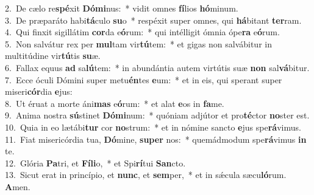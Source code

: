 {2.~}De cælo re\textbf{spé}xit \textbf{Dó}\textbf{mi}nus:~* vidit omnes \textbf{fí}lios \textbf{hó}minum.\\
{3.~}De præparáto habi\textbf{tá}culo \textbf{su}o~* respéxit super omnes, qui \textbf{há}bitant \textbf{ter}ram.\\
{4.~}Qui finxit sigillátim \textbf{cor}da e\textbf{ó}rum:~* qui intélligit ómnia ópe\textbf{ra} e\textbf{ó}rum.\\
{5.~}Non salvátur rex per \textbf{mul}tam vir\textbf{tú}tem:~* et gigas non salvábitur in multitúdine vir\textbf{tú}tis \textbf{su}æ.\\
{6.~}Fallax equus \textbf{ad} sa\textbf{lú}tem:~* in abundántia autem virtútis suæ \textbf{non} sal\textbf{vá}bitur.\\
{7.~}Ecce óculi Dómini super metu\textbf{én}tes \textbf{e}um:~* et in eis, qui sperant super miseri\textbf{cór}dia \textbf{e}jus:\\
{8.~}Ut éruat a morte áni\textbf{mas} e\textbf{ó}rum:~* et alat \textbf{e}os in \textbf{fa}me.\\
{9.~}Anima nostra \textbf{sú}stinet \textbf{Dó}\textbf{mi}num:~* quóniam adjútor et pro\textbf{té}ctor \textbf{no}ster est.\\
{10.~}Quia in eo lætábi\textbf{tur} cor \textbf{no}strum:~* et in nómine sancto \textbf{e}jus spe\textbf{rá}vimus.\\
{11.~}Fiat misericórdia tua, \textbf{Dó}mine, \textbf{su}\textbf{per} nos:~* quemádmodum spe\textbf{rá}vimus \textbf{in} te.\\
{12.~}Glória \textbf{Pa}tri, et \textbf{Fí}\textbf{li}o,~* et Spi\textbf{rí}tui \textbf{San}cto.\\
{13.~}Sicut erat in princípio, et \textbf{nunc}, et \textbf{sem}per,~* et in sǽcula sæcu\textbf{ló}rum. \textbf{A}men.\\
